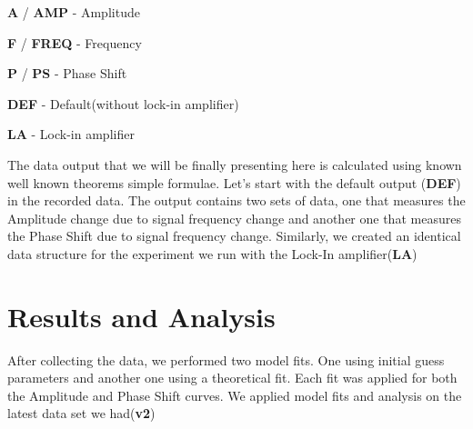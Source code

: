 \documentclass[twocolumn]{article}\usepackage[english]{babel}
\begin{document}
\begin{Steps}
 \item{\textbf{A} / \textbf{AMP} - Amplitude}
 \item{\textbf{F} / \textbf{FREQ} - Frequency }
 \item{\textbf{P} / \textbf{PS}  - Phase Shift}
 \item{\textbf{DEF} - Default(without lock-in amplifier)}
 \item{\textbf{LA} - Lock-in amplifier}
\end{Steps}
\newline \newline
The data output that we will be finally presenting here is calculated using known well known theorems simple formulae. Let's start with the default output (\textbf{DEF}) in the recorded data. The output contains two sets of data, one that measures the Amplitude change due to signal frequency change and another one that measures the Phase Shift due to signal frequency change. Similarly, we created an  identical data structure for the experiment we run with the Lock-In amplifier(\textbf{LA})   

\section{Results and Analysis}

After collecting the data, we performed two  model fits. One using initial guess parameters and another one using a theoretical fit. Each fit was applied for both the Amplitude and Phase Shift curves. We applied model fits and analysis on the latest data set we had(\textbf{v2})
\end{document}
